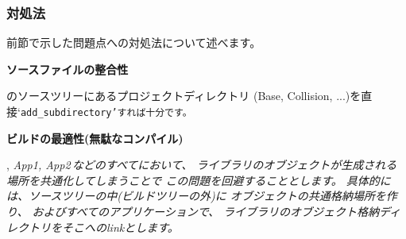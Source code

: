\subsubsection{対処法}
\label{subsubsec:Solutions}
\parindent=0pt

前節で示した問題点への対処法について述べます。

\bigskip
\bf{ソースファイルの整合性}
\begin{narrow}[20pt]
	\SprLib のソースツリーにあるプロジェクトディレクトリ
	(Base, Collision, ...)を直接`\tt{add\_subdirectory}'すれば十分です。
\end{narrow}

\medskip
\bf{ビルドの最適性(無駄なコンパイル)}
\begin{narrow}[20pt]
	\SprLib, \it{App1, App2\,}などのすべてにおいて、
	ライブラリのオブジェクトが生成される場所を共通化してしまうことで
	この問題を回避することとします。
	具体的には、\SprLib ソースツリーの中(ビルドツリーの外)に
	オブジェクトの共通格納場所を作り、
	\SprLib およびすべてのアプリケーションで、
	ライブラリのオブジェクト格納ディレクトリをそこへのlinkとします。


\end{narrow}
